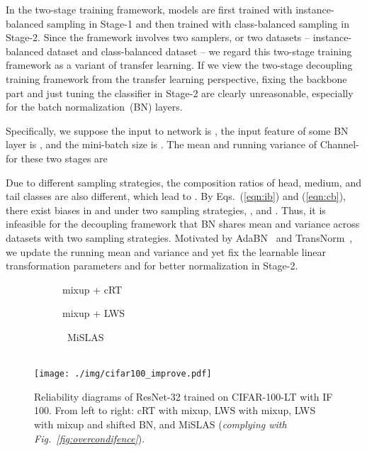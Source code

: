 \documentclass[final]{cvpr}
\begin{document}
	In the two-stage training framework, models are first trained with instance-balanced sampling in Stage-1 and then trained with class-balanced sampling in Stage-2. Since the framework involves two samplers, or two datasets -- instance-balanced dataset  and class-balanced dataset  -- we regard this two-stage training framework as a variant of transfer learning. If we view the two-stage decoupling training framework from the transfer learning perspective, fixing the backbone part and just tuning the classifier in Stage-2 are clearly unreasonable, especially for the batch normalization~(BN) layers.
	
	Specifically, we suppose the input to network is , the input feature of some BN layer is , and the mini-batch size is . The mean and running variance of Channel- for these two stages are
	
	
	


	Due to different sampling strategies, the composition ratios of head, medium, and tail classes are also different, which lead to . By Eqs.~(\ref{eqn:ib}) and (\ref{eqn:cb}), there exist biases in  and  under two sampling strategies, \ie,  and .  Thus, it is infeasible for the decoupling framework that BN shares mean and variance across datasets with two sampling strategies. Motivated by AdaBN~\cite{li2018adaptive} and TransNorm~\cite{wang2019transferable}, we update the running mean  and variance  and yet fix the learnable linear transformation parameters  and  for better normalization in Stage-2.
	


\begin{figure*}[t!]
		\begin{subfigure}{0.245\linewidth}
			\begin{center}
				{\quad \quad \hspace{3pt}  mixup + cRT}
			\end{center}
		\end{subfigure}
		\hfill
		\begin{subfigure}{0.245\linewidth}
			\centering
			{\quad \quad \hspace{-3pt}  mixup + LWS}
		\end{subfigure}
		\hfill
		\begin{subfigure}{0.245\linewidth}
			\centering
			{}
		\end{subfigure} 
		\hfill
		\begin{subfigure}{0.245\linewidth}
			\centering
			{\ MiSLAS}
		\end{subfigure} \\
		\centering
\texttt{[image: ./img/cifar100\_improve.pdf]} \\
		\caption{Reliability diagrams of ResNet-32 trained on CIFAR-100-LT with IF 100. From left to right: cRT with mixup, LWS with mixup, LWS with mixup and shifted BN, and MiSLAS (\textit{complying with Fig.~\ref{fig:overcondifence}}).}
		\label{fig:cifar100_rd_improve}
		\vspace{-8pt}
	\end{figure*}
	
\end{document}
